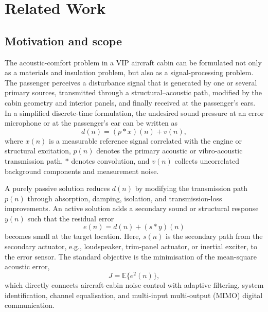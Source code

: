 \chapter{Related Work}


\section{Motivation and scope}
\label{sec:motivation-scope}

The acoustic-comfort problem in a VIP aircraft cabin can be formulated not only as a materials and insulation problem, but also as a signal-processing problem. The passenger perceives a disturbance signal that is generated by one or several primary sources, transmitted through a structural--acoustic path, modified by the cabin geometry and interior panels, and finally received at the passenger's ears. In a simplified discrete-time formulation, the undesired sound pressure at an error microphone or at the passenger's ear can be written as
\begin{equation}
    d(n) = (p * x)(n) + v(n),
    \label{eq:primary-path}
\end{equation}
where $x(n)$ is a measurable reference signal correlated with the engine or structural excitation, $p(n)$ denotes the primary acoustic or vibro-acoustic transmission path, $*$ denotes convolution, and $v(n)$ collects uncorrelated background components and measurement noise.

A purely passive solution reduces $d(n)$ by modifying the transmission path $p(n)$ through absorption, damping, isolation, and transmission-loss improvements. An active solution adds a secondary sound or structural response $y(n)$ such that the residual error
\begin{equation}
    e(n) = d(n) + (s * y)(n)
    \label{eq:error-signal}
\end{equation}
becomes small at the target location. Here, $s(n)$ is the secondary path from the secondary actuator, e.g., loudspeaker, trim-panel actuator, or inertial exciter, to the error sensor. The standard objective is the minimisation of the mean-square acoustic error,
\begin{equation}
    J = \mathbb{E}\{e^2(n)\},
    \label{eq:cost-function}
\end{equation}
which directly connects aircraft-cabin noise control with adaptive filtering, system identification, channel equalisation, and multi-input multi-output (MIMO) digital communication.

